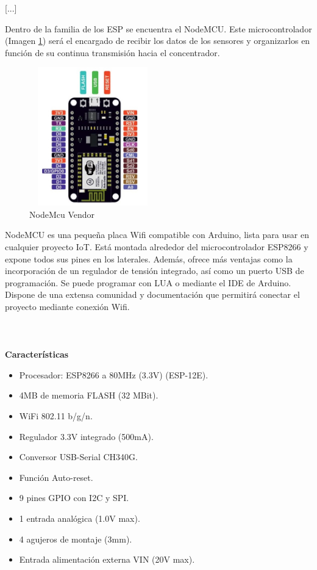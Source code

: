     [...]

    \vspace{4cm}

    Dentro de la familia de los ESP se encuentra el NodeMCU. Este microcontrolador (Imagen \ref{imag:nodemcu}) será el encargado de recibir los datos de los sensores y organizarlos en función de su continua transmisión hacia el concentrador.\\

    \begin{figure}[h]
        \centering
        \includegraphics[width=5.5cm, height=6cm]{imagenes/nodemcu0.jpg}
        \caption{NodeMcu Vendor}
        \label{imag:nodemcu}
    \end{figure}
    
    
    NodeMCU es una pequeña placa Wifi compatible con Arduino, lista para usar en cualquier proyecto IoT. Está montada alrededor del microcontrolador ESP8266 y expone todos sus pines en los laterales. Además, ofrece más ventajas como la incorporación de un regulador de tensión integrado, así como un puerto USB de programación. Se puede programar con LUA o mediante el IDE de Arduino.\\

    Dispone de una extensa comunidad y documentación que permitirá conectar el proyecto mediante conexión Wifi.\\\\\\\\

    \textbf{Características}
    \begin{itemize}
        \item Procesador: ESP8266 a 80MHz (3.3V) (ESP-12E).
        \item 4MB de memoria FLASH (32 MBit).
        \item WiFi 802.11 b/g/n.
        \item Regulador 3.3V integrado (500mA).
        \item Conversor USB-Serial CH340G.
        \item Función Auto-reset.
        \item 9 pines GPIO con I2C y SPI.
        \item 1 entrada analógica (1.0V max).
        \item 4 agujeros de montaje (3mm).
        \item Entrada alimentación externa VIN (20V max).
    \end{itemize}

